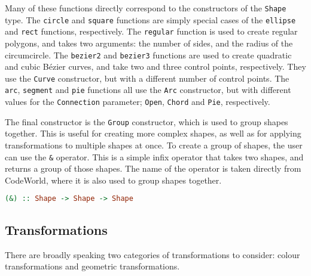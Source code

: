 \documentclass[../main.tex]{subfiles}
\begin{document}
                Many of these functions directly correspond to the constructors of the
                    \texttt{Shape} type.
                The \texttt{circle} and \texttt{square} functions are simply special cases of
                    the \texttt{ellipse} and \texttt{rect} functions, respectively.
                The \texttt{regular} function is used to create regular polygons, and takes two
                    arguments: the number of sides, and the radius of the circumcircle.
                The \texttt{bezier2} and \texttt{bezier3} functions are used to create
                    quadratic and cubic Bézier curves, and take two and three control points,
                    respectively.
                They use the \texttt{Curve} constructor, but with a different number of control
                    points.
                The \texttt{arc}, \texttt{segment} and \texttt{pie} functions all use the
                    \texttt{Arc} constructor, but with different values for the \texttt{Connection}
                    parameter; \texttt{Open}, \texttt{Chord} and \texttt{Pie}, respectively.

                The final constructor is the \texttt{Group} constructor, which is used to group
                    shapes together.
                This is useful for creating more complex shapes, as well as for applying
                    transformations to multiple shapes at once.
                To create a group of shapes, the user can use the \verb|&| operator.
                This is a simple infix operator that takes two shapes, and returns a group of
                    those shapes.
                The name of the operator is taken directly from CodeWorld, where it is also
                    used to group shapes together.

                \begin{lstlisting}[language={Haskell}, label={lst:group}, caption={The group (\texttt{\&}) operator.}]
(&) :: Shape -> Shape -> Shape\end{lstlisting}

        \subsection{Transformations}
            There are broadly speaking two categories of transformations to consider:
                colour transformations and geometric transformations.
\end{document}
